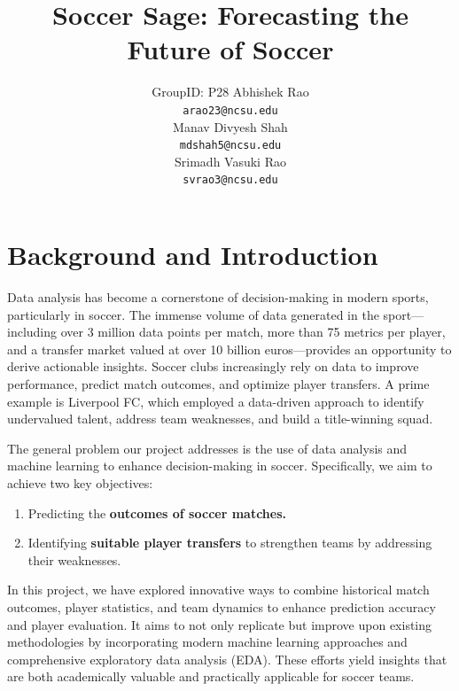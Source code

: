 \documentclass{article}
\begin{document}
\title{Soccer Sage: Forecasting the Future of Soccer}

\author{%
    GroupID: P28
    \AND
  Abhishek Rao \\
  \texttt{arao23@ncsu.edu} \\
  \And
  Manav Divyesh Shah \\
  \texttt{mdshah5@ncsu.edu} \\
  \And
  Srimadh Vasuki Rao \\
  \texttt{svrao3@ncsu.edu}
}


\maketitle

\section{Background and Introduction}
\label{gen_inst}

Data analysis has become a cornerstone of decision-making in modern sports, particularly in soccer. The immense volume of data generated in the sport—including over 3 million data points per match, more than 75 metrics per player, and a transfer market valued at over 10 billion euros—provides an opportunity to derive actionable insights. Soccer clubs increasingly rely on data to improve performance, predict match outcomes, and optimize player transfers. A prime example is Liverpool FC, which employed a data-driven approach to identify undervalued talent, address team weaknesses, and build a title-winning squad.

The general problem our project addresses is the use of data analysis and machine learning to enhance decision-making in soccer. Specifically, we aim to achieve two key objectives:
\begin{enumerate}
    \item Predicting the \textbf{outcomes of soccer matches.}
    \item Identifying \textbf{suitable player transfers} to strengthen teams by addressing their weaknesses.
\end{enumerate}

In this project, we have explored innovative ways to combine historical match outcomes, player statistics, and team dynamics to enhance prediction accuracy and player evaluation. It aims to not only replicate but improve upon existing methodologies by incorporating modern machine learning approaches and comprehensive exploratory data analysis (EDA). These efforts yield insights that are both academically valuable and practically applicable for soccer teams.
\end{document}
